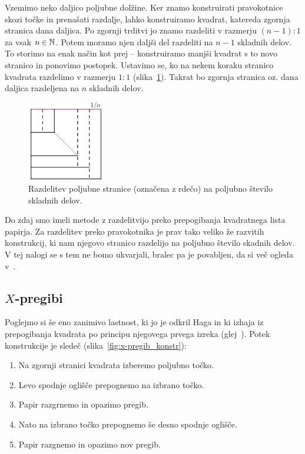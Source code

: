 \begin{dokaz}
    Vzemimo neko daljico poljubne dolžine. Ker znamo konstruirati pravokotnice skozi točke in prenašati razdalje, lahko konstruiramo kvadrat, katereda zgornja stranica dana daljica. Po zgornji trditvi jo znamo razdeliti v razmerju $(n-1) : 1$ za vsak $n \in \mathbb N$. Potem moramo njen daljši del razdeliti na $n-1$ skladnih delov. To storimo na enak način kot prej -- konstruiramo manjši kvadrat s to novo stranico in ponovimo postopek. Ustavimo se, ko na nekem koraku stranico kvadrata razdelimo v razmerju $1:1$ (slika~\ref{fig:razdelitev_daljice_n1}). Takrat bo zgornja stranica oz. dana daljica razdeljena na $n$ skladnih delov.
\begin{figure}[h]
    \centering
    \includegraphics[width=0.3\textwidth]{images/razdelitev_daljice_n1.png}
    \caption[Razdelitev daljice na enake dele]{Razdelitev poljubne stranice (označena z rdečo) na poljubno število skladnih delov.}
    \label{fig:razdelitev_daljice_n1}
\end{figure}
\end{dokaz}

Do zdaj smo imeli metode z razdelitvijo preko prepogibanja kvadratnega lista papirja. Za razdelitev preko pravokotnika je prav tako veliko že razvitih konstrukcij, ki nam njegovo stranico razdelijo na poljubno število skadnih delov. V tej nalogi se s tem ne bomo ukvarjali, bralec pa je povabljen, da si več ogleda v~\cite[str.\ 107--134]{haga2008}.

\subsection{$X$-pregibi}

Poglejmo si še eno zanimivo lastnost, ki jo je odkril Haga in ki izhaja iz prepogibanja kvadrata po principu njegovega prvega izreka (glej~\cite[str.\ 33--44]{haga2008}). Potek konstrukcije je sledeč (slika~\ref{fig:x-pregib_konstr}):
\begin{enumerate}
    \item Na zgornji stranici kvadrata izberemo poljubno točko.
    \item Levo spodnje oglišče prepognemo na izbrano točko.
    \item Papir razgrnemo in opazimo pregib.
    \item Nato na izbrano točko prepognemo še desno spodnje oglišče.
    \item Papir razgnemo in opazimo nov pregib.
\end{enumerate}

